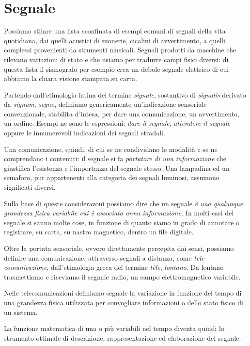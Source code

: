
\section{Segnale}

Possiamo stilare una lista sconfinata di esempi comuni di segnali della vita
quotidiana, dai quelli acustici di suonerie, cicalini di avvertimento, a quelli
complessi provenienti da strumenti musicali. Segnali prodotti da macchine che
rilevano variazioni di stato e che usiamo per tradurre campi fisici diversi:
di questa lista il sismografo per esempio crea un debole segnale elettrico di cui
abbiamo la chiara visione stampata su carta.

Partendo dall'etimologia latina del termine \emph{signale}, sostantivo di
\emph{signalis} derivato da \emph{signum}, \emph{segno}, definiamo genericamente
un'indicazione sensoriale convenzionale, stabilita d'intesa, per dare una
comunicazione, un avvertimento, un ordine. Esempi ne sono le espressioni:
\emph{dare il segnale}, \emph{attendere il segnale} oppure le innumerevoli
indicazioni dei segnali stradali.

Una comunicazione, quindi, di cui se ne condividano le modalità e se ne
comprendano i contenuti: il segnale si fa \emph{portatore di una informazione}
che giustifica l'esistenza e l'importanza del segnale stesso. Una lampadina ed un
semaforo, pur appartenenti alla categoria dei segnali luminosi, assumono
significati diversi.

Sulla base di queste considerazoni possiamo dire che un segnale \emph{è una
qualunque grandezza fisica variabile cui è associata unna informazione.} In molti
casi del segnale si sanno molte cose, in funzione di quanto siamo in grado di
annotare o registrare, su carta, su nastro magnetico, dentro un file digitale.

Oltre la portata sensoriale, ovvero direttamente percepita dai sensi, possiamo definire
una comunicazione, attraverso segnali a distanza, come \emph{tele-comunicazione},
dall'etimologia greca del termine \emph{têle}, \emph{lontano}. Da lontano
trasmettiamo e riceviamo il segnale radio, un campo elettromagnetico variabile.

Nelle telecomunicazioni definiamo segnale la variazione in funzione del tempo
di una grandezza fisica utilizzata per convogliare informazioni o dello stato
fisico di un sistema.

La funzione matematica di una o più variabili nel tempo diventa quindi lo
strumento ottimale di descrizione, rappresentazione ed elaborazione del segnale.

